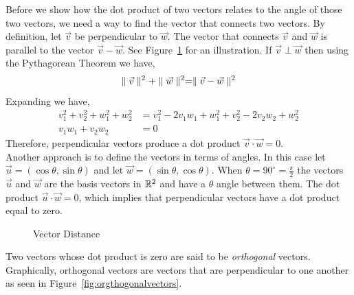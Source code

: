 \documentclass[12pt]{article}
\begin{document}
Before we show how the dot product of two vectors relates to the angle of those two vectors, we need a way to find the vector that connects two vectors. By definition, let $\vec{v}$ be perpendicular to $\vec{w}$. The vector that connects $\vec{v}$ and $\vec{w}$ is parallel to the vector $\vec{v}-\vec{w}$. See Figure~\ref{fig:vectordistance} for an illustration. If $\vec{v}\perp\vec{w}$ then using the Pythagorean Theorem we have,
\[
\parallel\vec{v}\parallel^2 + \parallel\vec{w}\parallel^2 = \parallel\vec{v}-\vec{w}\parallel^2
\]
Expanding we have,
\begin{align*}
v_1^2 + v_2^2 + w_1^2 + w_2^2 &= v_1^2 - 2v_1w_1 + w_1^2 + v_2^2 - 2v_2w_2 + w_2^2 \\
v_1w_1 + v_2w_2 &= 0
\end{align*}
Therefore, perpendicular vectors produce a dot product $\vec{v}\cdot\vec{w}=0$. \\

Another approach is to define the vectors in terms of angles. In this case let $\vec{u}=(\cos{\theta},\sin{\theta})$ and let $\vec{w}=(\sin{\theta},\cos{\theta})$. When $\theta=90^\circ=\frac{\pi}{2}$ the vectors $\vec{u}$ and $\vec{w}$ are the basis vectors in $\mathbb{R}^2$ and have a $\theta$ angle between them. The dot product $\vec{u}\cdot\vec{w} = 0$, which implies that perpendicular vectors have a dot product equal to zero. \\

\begin{figure}[h!]
\centering
\caption{Vector Distance}
\label{fig:vectordistance}
\end{figure}

 Two vectors whose dot product is zero are said to be \emph{orthogonal} vectors. Graphically, orthogonal vectors are vectors that are perpendicular to one another as seen in Figure~\ref{fig:orgthogonalvectors}. \\
\end{document}
